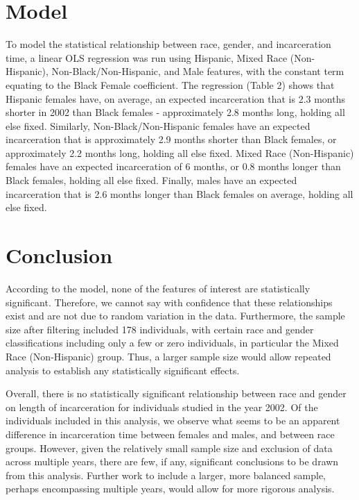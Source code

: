 \documentclass[12pt]{article}
\begin{document}
\section*{Model}
To model the statistical relationship between race, gender, and incarceration time, a linear OLS regression was run using Hispanic, Mixed Race (Non-Hispanic), Non-Black/Non-Hispanic, and Male features, with the constant term equating to the Black Female coefficient. The regression (Table 2) shows that Hispanic females have, on average, an expected incarceration that is 2.3 months shorter in 2002 than Black females - approximately 2.8 months long, holding all else fixed. Similarly, Non-Black/Non-Hispanic females have an expected incarceration that is approximately 2.9 months shorter than Black females, or approximately 2.2 months long, holding all else fixed. Mixed Race (Non-Hispanic) females have an expected incarceration of 6 months, or 0.8 months longer than Black females, holding all else fixed. Finally, males have an expected incarceration that is 2.6 months longer than Black females on average, holding all else fixed. 

\begin{table}[H]

\end{table}

\section*{Conclusion}
According to the model, none of the features of interest are statistically significant. Therefore, we cannot say with confidence that these relationships exist and are not due to random variation in the data. Furthermore, the sample size after filtering included 178 individuals, with certain race and gender classifications including only a few or zero individuals, in particular the Mixed Race (Non-Hispanic) group. Thus, a larger sample size would allow repeated analysis to establish any statistically significant effects. 

Overall, there is no statistically significant relationship between race and gender on length of incarceration for individuals studied in the year 2002. Of the individuals included in this analysis, we observe what seems to be an apparent difference in incarceration time between females and males, and between race groups. However, given the relatively small sample size and exclusion of data across multiple years, there are few, if any, significant conclusions to be drawn from this analysis. Further work to include a larger, more balanced sample, perhaps encompassing multiple years, would allow for more rigorous analysis. 
\end{document}
